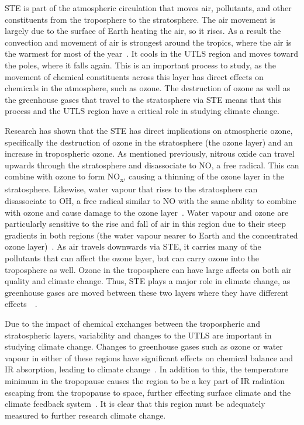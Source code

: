 STE is part of the atmospheric circulation that moves air, pollutants, and other constituents from the troposphere to the stratosphere. The air movement is largely due to the surface of Earth heating the air, so it rises. As a result the convection and movement of air is strongest around the tropics, where the air is the warmest for most of the year~\citep{STE_text}. It cools in the UTLS region and moves toward the poles, where it falls again. This is an important process to study, as the movement of chemical constituents across this layer has direct effects on chemicals in the atmosphere, such as ozone. The destruction of ozone as well as the greenhouse gases that travel to the stratosphere via STE means that this process and the UTLS region have a critical role in studying climate change.

Research has shown that the STE has direct implications on atmospheric ozone, specifically the destruction of ozone in the stratosphere (the ozone layer) and an increase in tropospheric ozone. As mentioned previously, nitrous oxide can travel upwards through the stratosphere and disassociate to NO, a free radical. This can combine with ozone to form NO\textsubscript{x}, causing a thinning of the ozone layer in the stratosphere. Likewise, water vapour that rises to the stratosphere can disassociate to OH, a free radical similar to NO with the same ability to combine with ozone and cause damage to the ozone layer~\citep{WMO_ozone}. Water vapour and ozone are particularly sensitive to the rise and fall of air in this region due to their steep gradients in both regions (the water vapour nearer to Earth and the concentrated ozone layer)~\citep{GLORIA_objectives}. As air travels downwards via STE, it carries many of the pollutants that can affect the ozone layer, but can carry ozone into the troposphere as well. Ozone in the troposphere can have large affects on both air quality and climate change. Thus, STE plays a major role in climate change, as greenhouse gases are moved between these two layers where they have different effects~\citep{STE_text}~\citep{UTLS_STE}.

Due to the impact of chemical exchanges between the tropospheric and stratospheric layers, variability and changes to the UTLS are important in studying climate change. Changes to greenhouse gases such as ozone or water vapour in either of these regions have significant effects on chemical balance and IR absorption, leading to climate change~\citep{climate_change_2007}. In addition to this, the temperature minimum in the tropopause causes the region to be a key part of IR radiation escaping from the tropopause to space, further effecting surface climate and the climate feedback system~\citep{ext_utls}. It is clear that this region must be adequately measured to further research climate change.

